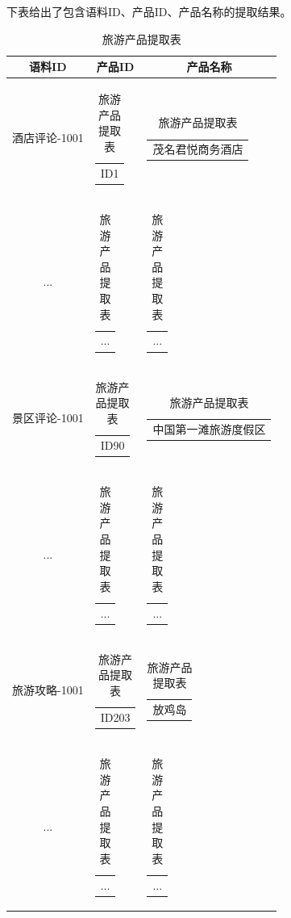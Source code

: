 \documentclass[bwprint]{gmcmthesis}
\begin{document}
下表给出了包含语料ID、产品ID、产品名称的提取结果。
\begin{center}
  \begin{longtable}{c|c|c}
    \caption{旅游产品提取表}
    \label{wx_yj_related}\\
      \hline
      \textbf{语料ID} & \textbf{产品ID} & \textbf{产品名称} \\
      \hline
      酒店评论-1001 & \begin{tabular}[c]{@{}c@{}}
        ID1
        \end{tabular} 
        & \begin{tabular}[c]{@{}l@{}}
          茂名君悦商务酒店
        \end{tabular} \\
        ... & \begin{tabular}[c]{@{}c@{}}
          ...
        \end{tabular} 
        & \begin{tabular}[c]{@{}l@{}}
          ...
        \end{tabular} \\
        景区评论-1001 & \begin{tabular}[c]{@{}c@{}}
          ID90
          \end{tabular} 
          & \begin{tabular}[c]{@{}l@{}}
            中国第一滩旅游度假区
          \end{tabular} \\
          ... & \begin{tabular}[c]{@{}c@{}}
            ...
          \end{tabular} 
          & \begin{tabular}[c]{@{}l@{}}
            ...
          \end{tabular} \\
          旅游攻略-1001 & \begin{tabular}[c]{@{}c@{}}
            ID203
            \end{tabular} 
            & \begin{tabular}[c]{@{}l@{}}
              放鸡岛
            \end{tabular} \\
            ... & \begin{tabular}[c]{@{}c@{}}
              ...
            \end{tabular} 
            & \begin{tabular}[c]{@{}l@{}}
              ...
            \end{tabular} \\

\end{longtable}
\end{center}
\end{document}
